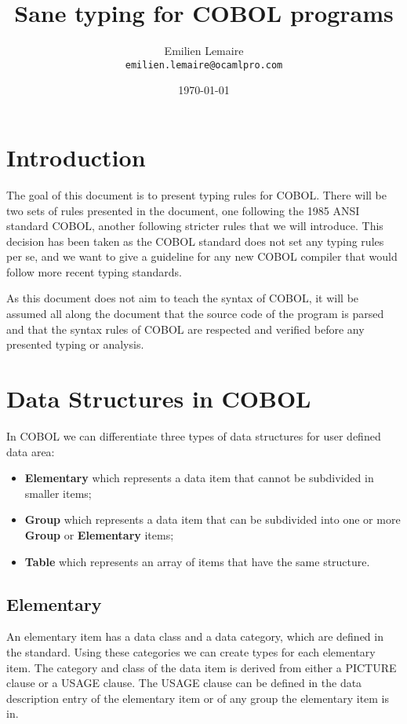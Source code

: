 \documentclass[a4paper,10pt]{article}
\title{Sane typing for COBOL programs}
\author{Emilien Lemaire \\ {\tt emilien.lemaire@ocamlpro.com}}
\date{\today}
\begin{document}
\maketitle{}
\pagebreak
\tableofcontents
\listoftables
\listoffigures
\pagebreak
\section{Introduction}
\label{sec:intro}
The goal of this document is to present typing rules for COBOL. There will be two sets of
rules presented in the document, one following the 1985 ANSI standard COBOL, another following
stricter rules that we will introduce. This decision has been taken as the COBOL standard
does not set any typing rules per se, and we want to give a guideline for any new COBOL
compiler that would follow more recent typing standards.

As this document does not aim to teach the syntax of COBOL, it will be assumed all along the document
that the source code of the program is parsed and that the syntax rules of COBOL are respected and
verified before any presented typing or analysis.

\pagebreak
\section{Data Structures in COBOL}
In COBOL we can differentiate three types of data structures for user defined data area:
\begin{itemize}
  \item {\bf Elementary} which represents a data item that cannot be subdivided in smaller items;
  \item {\bf Group} which represents a data item that can be subdivided into one or more {\bf Group}
    or {\bf Elementary} items;
  \item {\bf Table} which represents an array of items that have the same structure.
\end{itemize}

\subsection{Elementary}
An elementary item has a data class and a data category, which are defined in the standard. Using
these categories we can create types for each elementary item. The category and class of the data
item is derived from either a PICTURE clause or a USAGE clause. The USAGE clause can be defined
in the data description entry of the elementary item or of any group the elementary item is in.
\end{document}
